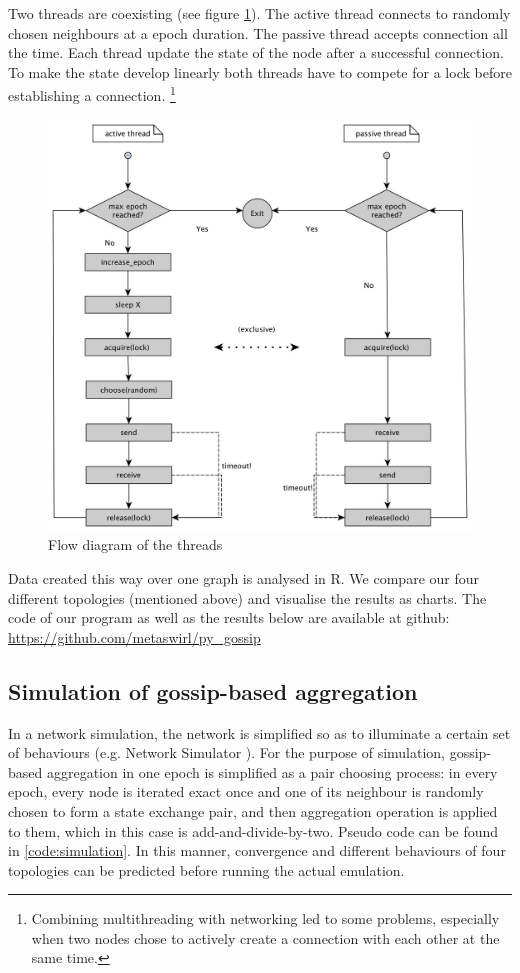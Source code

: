 Two threads are coexisting (see figure \ref{fig:flow_diag}). The active thread connects to randomly chosen neighbours at a epoch duration. The passive thread accepts connection all the time. Each thread update the state of the node after a successful connection. To make the state develop linearly both threads have to compete for a lock before establishing a connection. \footnote{Combining multithreading with networking led to some problems, especially when two nodes chose to actively create a connection with each other at the same time.}
\begin{figure}[h!]
    \begin{center}
        \includegraphics[scale=0.25]{flow_diag.jpg}
    \end{center}
    \caption{Flow diagram of the threads}
    \label{fig:flow_diag}
\end{figure}

Data created this way over one graph is analysed in R. We compare our four different topologies (mentioned above) and visualise the results as charts. The code of our program as well as the results below are available at github: \url{https://github.com/metaswirl/py_gossip}

\subsection{Simulation of gossip-based aggregation}
In a network simulation, the network is simplified so as to illuminate a certain set of behaviours (e.g. Network Simulator \cite{ns}). For the purpose of simulation, gossip-based aggregation in one epoch is simplified as a pair choosing process: in every epoch, every node is iterated exact once and one of its neighbour is randomly chosen to form a state exchange pair, and then aggregation operation is applied to them, which in this case is add-and-divide-by-two. Pseudo code can be found in \ref{code:simulation}. In this manner, convergence and different behaviours of four topologies can be predicted before running the actual emulation.

